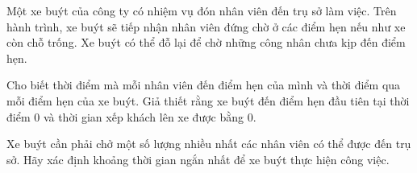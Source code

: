 Một xe buýt của công ty có nhiệm vụ đón nhân viên đến trụ sở làm việc. Trên hành trình, xe buýt sẽ tiếp nhận nhân viên đứng chờ ở các điểm hẹn   nếu như xe còn chỗ trống. Xe buýt có thể đỗ lại để chờ những công nhân chưa kịp đến điểm hẹn.  

   Cho biết thời điểm mà mỗi nhân viên đến điểm hẹn của mình và thời điểm qua mỗi điểm hẹn của xe buýt. Giả thiết rằng xe buýt đến điểm hẹn đầu   tiên tại thời điểm 0 và thời gian xếp khách lên xe được bằng 0.  

   Xe buýt cần phải chở một số lượng nhiều nhất các nhân viên có thể được đến trụ sở. Hãy xác định khoảng thời gian ngắn nhất để xe buýt thực hiện   công việc.